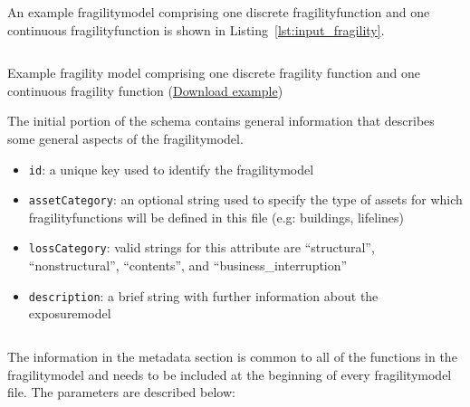 An example \gls{fragilitymodel} comprising one discrete
\gls{fragilityfunction} and one continuous \gls{fragilityfunction} is shown in
Listing~\ref{lst:input_fragility}.

\begin{listing}[htbp]
  \inputminted[firstline=1,firstnumber=1,fontsize=\footnotesize,frame=single,linenos,bgcolor=lightgray]{xml}{oqum/risk/Verbatim/input_fragility.xml}
  \caption{Example fragility model comprising one discrete fragility function and one continuous fragility function (\href{https://raw.githubusercontent.com/GEMScienceTools/oq-engine-docs/master/oqum/risk/verbatim/input_fragility.xml}{Download example})}
  \label{lst:input_fragility}
\end{listing}


The initial portion of the schema contains general information that describes 
some general aspects of the \gls{fragilitymodel}.

\begin{itemize}

    \item \Verb+id+: a unique key used to identify the \gls{fragilitymodel}

    \item \Verb+assetCategory+: an optional string used to specify the type of
    \glspl{asset} for which \glspl{fragilityfunction} will be defined in this
    file (e.g: buildings, lifelines)

    \item \Verb+lossCategory+: valid strings for this attribute are 
    ``structural'', ``nonstructural'', ``contents'', and 
    ``business\_interruption''

    \item \Verb+description+: a brief string with further information about the
    \gls{exposuremodel}

\end{itemize}

\inputminted[firstline=4,firstnumber=4,lastline=9,fontsize=\footnotesize,frame=single,linenos,bgcolor=lightgray]{xml}{oqum/risk/Verbatim/input_fragility.xml}

The information in the metadata section is common to all of the functions in
the \gls{fragilitymodel} and needs to be included at the beginning of every
\gls{fragilitymodel} file. The parameters are described below:

